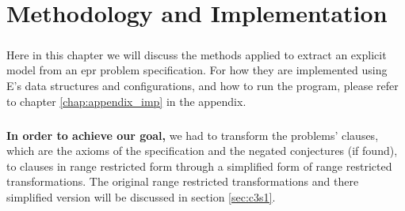 \chapter{Methodology and Implementation}\label{chap:meth_and_impl}

	\paragraph{} 
	Here in this chapter we will discuss the methods applied to extract an explicit model from an \ac{epr} problem specification. For how they are implemented using E's data structures and configurations, and how to run the program, please refer to chapter \ref{chap:appendix_imp} in the appendix.

	\paragraph{} 
	\textbf{In order to achieve our goal,} we had to transform the problems' clauses, which are the axioms of the specification and the negated conjectures (if found), to clauses in range restricted form through a simplified form of range restricted transformations. The original range restricted transformations and there simplified version will be discussed in section \ref{sec:c3s1}.  

	
	
	